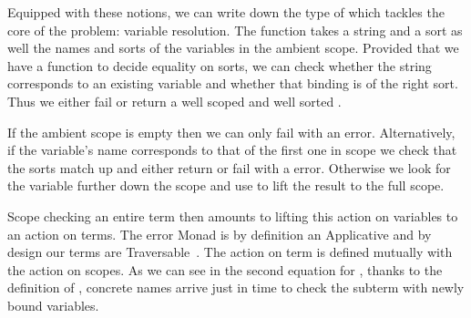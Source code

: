 Equipped with these notions, we can write down the type of  which
tackles the core of the problem: variable resolution. The function takes a
string and a sort as well the names and sorts of the variables in the ambient
scope. Provided that we have a function  to decide equality on sorts,
we can check whether the string corresponds to an existing variable and whether
that binding is of the right sort. Thus we either fail or return a well scoped
and well sorted .

If the ambient scope is empty then we can only fail with an  error.
Alternatively, if the variable's name corresponds to that of the first one
in scope we check that the sorts match up and either return  or fail
with a  error. Otherwise we look for the variable further
down the scope and use  to lift the result to the full scope.

\begin{agdasnippet}
\end{agdasnippet}

Scope checking an entire term then amounts to lifting this action on
variables to an action on terms. The error Monad  is by
definition an Applicative and by design our terms are
Traversable~\cite{bird_paterson_1999,DBLP:journals/jfp/GibbonsO09}.
The action on term is defined mutually with the action on scopes.
As we can see in the second equation for , thanks to the
definition of , concrete names arrive just in time to
check the subterm with newly bound variables.

\begin{agdasnippet}
\end{agdasnippet}

